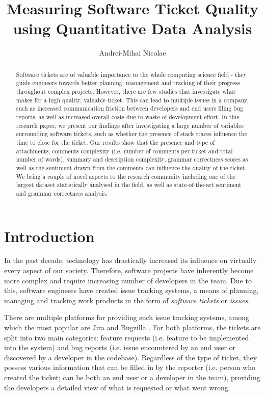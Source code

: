\documentclass{mpaper}
\begin{document}
\title{Measuring Software Ticket Quality using Quantitative Data Analysis}
\author{Andrei-Mihai Nicolae}

\maketitle

\begin{abstract}
Software tickets are of valuable importance to the whole computing science 
field - they guide engineers towards better planning, management 
and tracking of their progress throughout complex projects. However, there
are few studies that investigate what makes for a high quality,
valuable ticket. This can lead to multiple issues in a company, such as 
increased communication friction between developers and end users filing bug
reports, as well as increased overall costs due to waste of development effort. 
In this research paper, we present our findings after 
investigating a large number of variables surrounding software tickets, 
such as whether the presence of stack traces influence the time 
to close for the ticket. Our results show that the presence and type of attachments,
comments complexity (i.e. number of comments per ticket and total number of words), 
summary and description complexity, grammar correctness scores
as well as the sentiment drawn from the comments can influence the quality of the ticket.
We bring a couple of novel aspects to the research
community including one of the largest dataset statistically analysed in the field,
as well as state-of-the-art sentiment and grammar correctness analysis.
\end{abstract}

\section{Introduction}\label{intro}

In the past decade, technology has drastically increased its influence on 
virtually every aspect of our society. Therefore, software projects have 
inherently become more complex and require increasing number of developers in
the team. Due to this, software engineers have created issue tracking systems,
a means of planning, managing and tracking work products in the form of 
\emph{software tickets} or \emph{issues}.

There are multiple platforms for providing such issue tracking systems, among which
the most popular are Jira \cite{jira} and Bugzilla \cite{bugzilla}. For both platforms,
the tickets are split into two main categories: feature requests (i.e. feature to be 
implemented into the system) and bug reports (i.e. issue encountered by an end user or
discovered by a developer in the codebase). Regardless of the type of ticket, they possess
various information that can be filled in by the reporter (i.e. person who created the ticket; 
can be both an end user or a developer in the team), providing the developers
a detailed view of what is requested or what went wrong.
\end{document}
